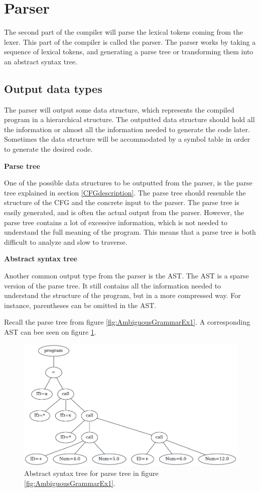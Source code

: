 \section{Parser}

The second part of the compiler will parse the lexical tokens coming from the lexer. 
This part of the compiler is called the parser. 
The parser works by taking a sequence of lexical tokens, and generating a parse tree or transforming them into an abstract syntax tree. 

\subsection{Output data types}

The parser will output some data structure, which represents the compiled program in a hierarchical structure. 
The outputted data structure should hold all the information or almost all the information needed to generate the code later. 
Sometimes the data structure will be accommodated by a symbol table in order to generate the desired code.

\textbf{Parse tree}

One of the possible data structures to be outputted from the parser, is the parse tree explained in section \ref{CFGdescription}. 
The parse tree should resemble the structure of the CFG and the concrete input to the parser. 
The parse tree is easily generated, and is often the actual output from the parser. 
However, the parse tree contains a lot of excessive information, which is not needed to understand the full meaning of the program. 
This means that a parse tree is both difficult to analyze and slow to traverse. 

\textbf{Abstract syntax tree}

Another common output type from the parser is the AST.
The AST is a sparse version of the parse tree. 
It still contains all the information needed to understand the structure of the program, but in a more compressed way. 
For instance, parentheses can be omitted in the AST.

Recall the parse tree from figure \ref{fig:AmbiguousGrammarEx1}. 
A corresponding AST can bee seen on figure \ref{fig:ast}.

\begin{figure}[H]
	\centering
	\includegraphics[width=\textwidth*5/6]{3.Theory/images/ast.png}
	\caption{
		Abstract syntax tree for parse tree in figure \ref{fig:AmbiguousGrammarEx1}.
	}
	\label{fig:ast}
\end{figure}

